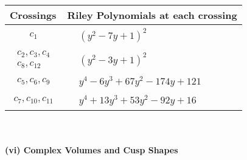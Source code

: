 \documentclass[1p]{elsarticle_modified}
\theoremstyle{definition}
\begin{document}
\begin{tabular}{m{50pt}|m{274pt}}
Crossings & \hspace{64pt}Riley Polynomials at each crossing \\
\hline $$\begin{aligned}c_{1}\end{aligned}$$&$\begin{aligned}
&(y^2-7 y+1)^2
\end{aligned}$\\
\hline $$\begin{aligned}c_{2},c_{3},c_{4}\\c_{8},c_{12}\end{aligned}$$&$\begin{aligned}
&(y^2-3 y+1)^2
\end{aligned}$\\
\hline $$\begin{aligned}c_{5},c_{6},c_{9}\end{aligned}$$&$\begin{aligned}
&y^4-6 y^3+67 y^2-174 y+121
\end{aligned}$\\
\hline $$\begin{aligned}c_{7},c_{10},c_{11}\end{aligned}$$&$\begin{aligned}
&y^4+13 y^3+53 y^2-92 y+16
\end{aligned}$\\
\hline
\end{tabular}\\~\\
\newpage\flushleft \textbf{(vi) Complex Volumes and Cusp Shapes}
\end{document}

